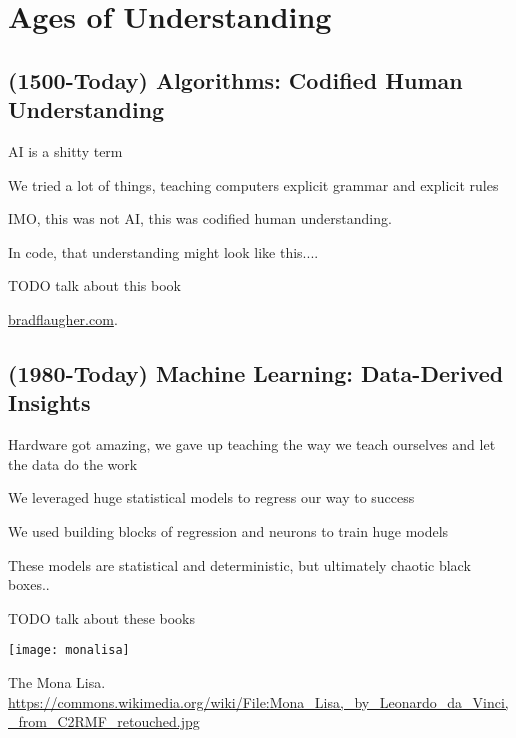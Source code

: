 \setchapterpreamble[u]{\margintoc}
\chapter{Ages of Understanding}

\section{(1500-Today) Algorithms: Codified Human Understanding}

AI is a shitty term

We tried a lot of things, teaching computers explicit grammar and explicit rules

IMO, this was not AI, this was codified human understanding.

In code, that understanding might look like this.... %

TODO talk about this book 

\href{https://bradflaugher.com}{bradflaugher.com}.  


\section{(1980-Today) Machine Learning: Data-Derived Insights}

Hardware got amazing, we gave up teaching the way we teach ourselves and let the data do the work

We leveraged huge statistical models to regress our way to success

We used building blocks of regression and neurons to train huge models

These models are statistical and deterministic, but ultimately chaotic black boxes..

TODO talk about these books \cite{MacAskill2022} \cite{Metz2022Sep} \cite{Metz2022Sep2}


\begin{marginfigure}[-5.5cm]
	\texttt{[image: monalisa]}
	\caption[The Mona Lisa]{The Mona Lisa.\\ 
	\url{https://commons.wikimedia.org/wiki/File:Mona_Lisa,_by_Leonardo_da_Vinci,_from_C2RMF_retouched.jpg}}
\end{marginfigure}
